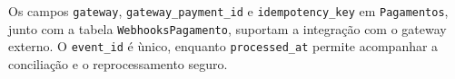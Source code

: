 \documentclass[12pt,a4paper]{article}
\begin{document}
Os campos \texttt{gateway}, \texttt{gateway\_payment\_id} e \texttt{idempotency\_key} em \texttt{Pagamentos}, junto com a tabela \texttt{WebhooksPagamento}, suportam a integra\c{c}\~ao com o gateway externo. O \texttt{event\_id} \'e \`unico, enquanto \texttt{processed\_at} permite acompanhar a concilia\c{c}\~ao e o reprocessamento seguro.
\end{document}
